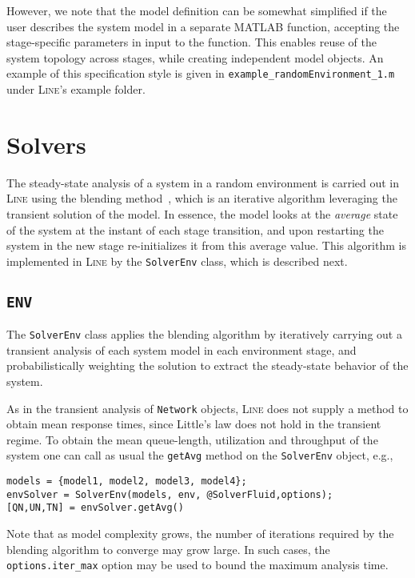 However, we note that the model definition can be somewhat simplified if the user describes the system model in a separate MATLAB function, accepting the stage-specific parameters in input to the function. This enables reuse of the system topology across stages, while creating independent model objects. An example of this specification style is given in \texttt{example\_randomEnvironment\_1.m} under \textsc{Line}'s example folder.

\section{Solvers}
The steady-state analysis of a system in a random environment is carried out in \textsc{Line} using the blending method~\cite{CasTH14}, which is an iterative algorithm leveraging the transient solution of the model. In essence, the model looks at the \emph{average} state of the system at the instant of each stage transition, and upon restarting the system in the new stage re-initializes it from this average value. This algorithm is implemented  in \textsc{Line} by the \texttt{SolverEnv} class, which is described next.

\subsection{\texttt{ENV}}
 The \texttt{SolverEnv} class applies the blending algorithm by iteratively carrying out a transient analysis of each system model in each environment stage, and probabilistically weighting the solution to extract the steady-state behavior of the system.

 As in the transient analysis of \texttt{Network} objects, \textsc{Line} does not supply a method to obtain mean response times, since Little's law does not hold in the transient regime. To obtain the mean queue-length, utilization and throughput of the system one can call as usual the \texttt{getAvg} method on the \texttt{SolverEnv} object, e.g.,
\begin{lstlisting}
models = {model1, model2, model3, model4};
envSolver = SolverEnv(models, env, @SolverFluid,options);
[QN,UN,TN] = envSolver.getAvg()
\end{lstlisting}
Note that as model complexity grows, the number of iterations required by the blending algorithm to converge may grow large. In such cases, the \texttt{options.iter\_max} option may be used to bound the maximum analysis time. 